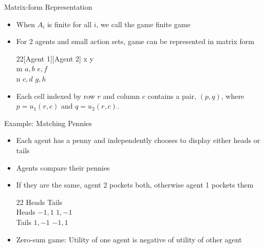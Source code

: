 \documentclass[11pt,aspectratio=169]{beamer}
\begin{document}
  \begin{frame}{Matrix-form Representation}
   \begin{itemize}[<+->]
    \item When $A_i$ is finite for all $i$, we call the game \alert{finite game}
    \item For 2 agents and small action sets, game can be represented in \alert{matrix form}
    \vspace{0.7em}
    \begin{center}
     \hspace{-5.6em}
     \begin{game}{2}{2}[Agent 1][Agent 2]
      	\> x		\> y		\\
      m	\> $a,b$	\> $e,f$	\\
      n	\> $c,d$	\> $g,h$
     \end{game}
    \end{center}
    \vspace{0.7em}
    \item Each cell indexed by  row $r$ and column $c$ contains a pair, $(p,q)$, where $p = u_1(r,c)$ and $q = u_2(r,c)$.
   \end{itemize}
  \end{frame}
 
  \begin{frame}{Example: Matching Pennies}
   \begin{itemize}
    \item Each agent has a penny and independently chooses to display either heads or tails
    \item Agents compare their pennies
    \item<+-> If they are the same, agent 2 pockets both, otherwise agent 1 pockets them
    \begin{center}
     \hspace{-3.5em}
     \begin{game}{2}{2}
      		\> Heads		\> Tails		\\
      Heads	\> $-1,1$	\> $1,-1$	\\
      Tails	\> $1,-1$	\> $-1,1$
     \end{game}
    \end{center}
    \vspace{0.7em}
    \item<+-> \alert{Zero-sum game}: Utility of one agent is negative of utility of other agent
   \end{itemize}
  \end{frame}
\end{document}
